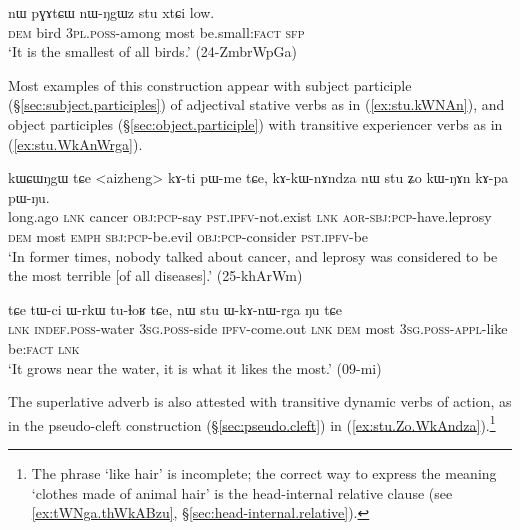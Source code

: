  
\begin{exe}
\ex \label{ex:nWNgWz.stu.xtCi}
\gll nɯ pɣɤtɕɯ nɯ-ŋgɯz stu xtɕi low.\\
\textsc{dem} bird \textsc{3pl}.\textsc{poss}-among most be.small:\textsc{fact} \textsc{sfp} \\
\glt `It is the smallest of all birds.' (24-ZmbrWpGa)
\end{exe}

Most examples of this construction appear with subject participle (§\ref{sec:subject.participles}) of adjectival stative verbs as in (\ref{ex:stu.kWNAn}), and object participles (§\ref{sec:object.participle}) with transitive experiencer verbs as in (\ref{ex:stu.WkAnWrga}).

\begin{exe}
\ex \label{ex:stu.kWNAn}
\gll kɯɕɯŋgɯ tɕe <aizheng> kɤ-ti pɯ-me tɕe, kɤ-kɯ-nɤndza nɯ stu ʑo kɯ-ŋɤn kɤ-pa pɯ-ŋu.  \\
long.ago \textsc{lnk} cancer \textsc{obj}:\textsc{pcp}-say \textsc{pst}.\textsc{ipfv}-not.exist \textsc{lnk} \textsc{aor}-\textsc{sbj}:\textsc{pcp}-have.leprosy \textsc{dem} most \textsc{emph} \textsc{sbj}:\textsc{pcp}-be.evil \textsc{obj}:\textsc{pcp}-consider \textsc{pst}.\textsc{ipfv}-be \\
\glt `In former times, nobody talked about cancer, and leprosy was considered to be the most terrible [of all diseases].' (25-khArWm)
\end{exe}

\begin{exe}
\ex \label{ex:stu.WkAnWrga}
\gll tɕe tɯ-ci ɯ-rkɯ tu-ɬoʁ tɕe, nɯ stu ɯ-kɤ-nɯ-rga ŋu tɕe \\
\textsc{lnk} \textsc{indef}.\textsc{poss}-water \textsc{3sg}.\textsc{poss}-side \textsc{ipfv}-come.out \textsc{lnk} \textsc{dem} most \textsc{3sg}.\textsc{poss}-\textsc{appl}-like be:\textsc{fact} \textsc{lnk} \\
\glt `It grows near the water, it is what it likes the most.' (09-mi)
\end{exe}

The superlative adverb is also attested with transitive dynamic verbs of action, as in the pseudo-cleft construction (§\ref{sec:pseudo.cleft}) in (\ref{ex:stu.Zo.WkAndza}).\footnote{The phrase  `like hair' is incomplete; the correct way to express the meaning `clothes made of animal hair' is the head-internal relative clause  (see \ref{ex:tWNga.thWkABzu}, §\ref{sec:head-internal.relative}).} 

